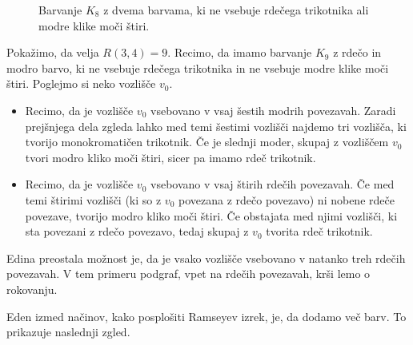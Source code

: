 \documentclass[twoside,11pt]{article}
\begin{document}
\begin{zgled}
\begin{figure}[h!]
        \caption{Barvanje $K_{8}$ z dvema barvama, ki ne vsebuje rdečega trikotnika ali 
        modre klike moči štiri.}
        \label{fig:r34}
    \end{figure}

    Pokažimo, da velja $R(3, 4) = 9$. Recimo, da imamo barvanje $K_9$ z rdečo in modro 
    barvo, ki ne vsebuje rdečega trikotnika in ne vsebuje modre klike moči štiri. Poglejmo 
    si neko vozlišče $v_0$. 
    \begin{itemize}
        \item Recimo, da je vozlišče $v_0$ vsebovano v vsaj šestih modrih povezavah. Zaradi 
        prejšnjega dela zgleda lahko med temi šestimi vozlišči najdemo tri vozlišča,
        ki tvorijo monokromatičen trikotnik. Če je slednji moder, skupaj z vozliščem $v_0$ tvori modro kliko moči 
        štiri, sicer pa imamo rdeč trikotnik.

        \item Recimo, da je vozlišče $v_0$ vsebovano v vsaj štirih rdečih povezavah. Če 
        med temi štirimi vozlišči (ki so z $v_0$ povezana z rdečo povezavo) ni nobene 
        rdeče povezave, tvorijo modro kliko moči štiri. Če obstajata med njimi vozlišči, 
        ki sta povezani z rdečo povezavo, tedaj skupaj z $v_0$ tvorita rdeč trikotnik.
    \end{itemize}
    
    Edina preostala možnost je, da je vsako vozlišče vsebovano v natanko treh rdečih povezavah. 
    V tem primeru podgraf, vpet na rdečih povezavah, krši lemo o rokovanju.
\end{zgled}

Eden izmed načinov, kako posplošiti Ramseyev izrek, je, da dodamo več barv. To prikazuje 
naslednji zgled. 
\end{document}

